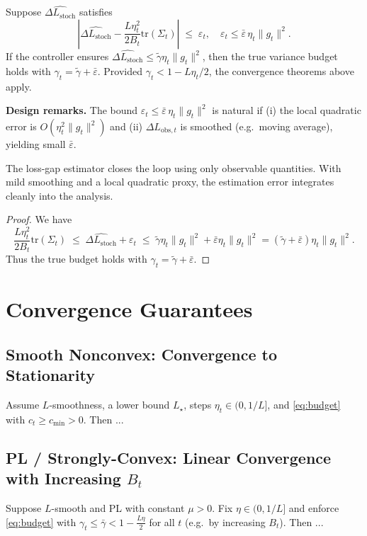 \documentclass[12pt]{article}
\begin{document}
Suppose $\widehat{\Delta L_{\text{stoch}}}$ satisfies
\[
\left| \widehat{\Delta L_{\text{stoch}}} - \frac{L\eta_t^2}{2B_t}\mathrm{tr}(\Sigma_t)\right|
\;\le\; \varepsilon_t,
\quad
\varepsilon_t \le \bar\varepsilon \,\eta_t\|g_t\|^2.
\]
If the controller ensures $\widehat{\Delta L_{\text{stoch}}}\le \tilde\gamma \eta_t\|g_t\|^2$, then the true variance budget holds with $\gamma_t=\tilde\gamma+\bar\varepsilon$. Provided $\gamma_t < 1-L\eta_t/2$, the convergence theorems above apply.

\noindent \textbf{Design remarks.} The bound $\varepsilon_t\!\le\!\bar\varepsilon\,\eta_t\|g_t\|^2$ is natural if (i) the local quadratic error is $O(\eta_t^2\|g_t\|^2)$ and (ii) $\Delta L_{\mathrm{obs},t}$ is smoothed (e.g.\ moving average), yielding small $\bar\varepsilon$. 

\noindent The loss-gap estimator closes the loop using only observable quantities. With mild smoothing and a local quadratic proxy, the estimation error integrates cleanly into the analysis.

\begin{proof}
We have
\[
\frac{L\eta_t^2}{2B_t}\mathrm{tr}(\Sigma_t)
\;\le\; \widehat{\Delta L_{\text{stoch}}} + \varepsilon_t
\;\le\; \tilde\gamma \eta_t\|g_t\|^2 + \bar\varepsilon \eta_t\|g_t\|^2
= (\tilde\gamma+\bar\varepsilon)\eta_t\|g_t\|^2.
\]
Thus the true budget holds with $\gamma_t=\tilde\gamma+\bar\varepsilon$.
\end{proof}


\section{Convergence Guarantees}
\subsection{Smooth Nonconvex: Convergence to Stationarity}
Assume $L$-smoothness, a lower bound $L_\star$, steps $\eta_t\in(0,1/L]$, and \eqref{eq:budget} with $c_t\ge c_{\min}>0$. Then ...
\subsection{PL / Strongly-Convex: Linear Convergence with Increasing $B_t$}
Suppose $L$-smooth and PL with constant $\mu>0$. Fix $\eta\in(0,1/L]$ and enforce \eqref{eq:budget} with $\gamma_t\le\bar\gamma<1-\tfrac{L\eta}{2}$ for all $t$ (e.g.\ by increasing $B_t$). Then ...
\end{document}
